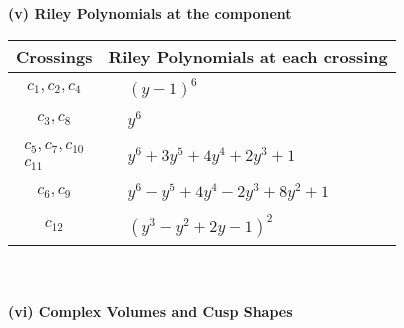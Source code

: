 \documentclass[1p]{elsarticle_modified}
\theoremstyle{definition}
\begin{document}
\newpage\renewcommand{\arraystretch}{1}
\flushleft \textbf{(v) Riley Polynomials at the component}\newline \\
\begin{tabular}{m{50pt}|m{274pt}}
Crossings & \hspace{64pt}Riley Polynomials at each crossing \\
\hline $$\begin{aligned}c_{1},c_{2},c_{4}\end{aligned}$$&$\begin{aligned}
&(y-1)^6
\end{aligned}$\\
\hline $$\begin{aligned}c_{3},c_{8}\end{aligned}$$&$\begin{aligned}
&y^6
\end{aligned}$\\
\hline $$\begin{aligned}c_{5},c_{7},c_{10}\\c_{11}\end{aligned}$$&$\begin{aligned}
&y^6+3 y^5+4 y^4+2 y^3+1
\end{aligned}$\\
\hline $$\begin{aligned}c_{6},c_{9}\end{aligned}$$&$\begin{aligned}
&y^6- y^5+4 y^4-2 y^3+8 y^2+1
\end{aligned}$\\
\hline $$\begin{aligned}c_{12}\end{aligned}$$&$\begin{aligned}
&(y^3- y^2+2 y-1)^2
\end{aligned}$\\
\hline
\end{tabular}\\~\\
\newpage\flushleft \textbf{(vi) Complex Volumes and Cusp Shapes}
\end{document}
